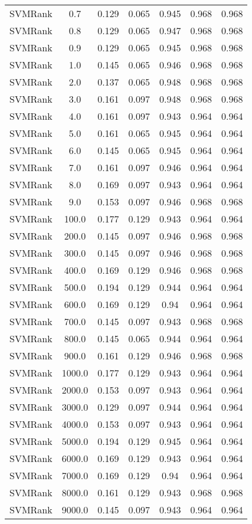 \begin{longtable}{*{7}{c}}
SVMRank & 0.7 & 0.129 & 0.065 & 0.945 & 0.968 & 0.968 \\ 
SVMRank & 0.8 & 0.129 & 0.065 & 0.947 & 0.968 & 0.968 \\ 
SVMRank & 0.9 & 0.129 & 0.065 & 0.945 & 0.968 & 0.968 \\ 
SVMRank & 1.0 & 0.145 & 0.065 & 0.946 & 0.968 & 0.968 \\ 
SVMRank & 2.0 & 0.137 & 0.065 & 0.948 & 0.968 & 0.968 \\ 
SVMRank & 3.0 & 0.161 & 0.097 & 0.948 & 0.968 & 0.968 \\ 
SVMRank & 4.0 & 0.161 & 0.097 & 0.943 & 0.964 & 0.964 \\ 
SVMRank & 5.0 & 0.161 & 0.065 & 0.945 & 0.964 & 0.964 \\ 
SVMRank & 6.0 & 0.145 & 0.065 & 0.945 & 0.964 & 0.964 \\ 
SVMRank & 7.0 & 0.161 & 0.097 & 0.946 & 0.964 & 0.964 \\ 
SVMRank & 8.0 & 0.169 & 0.097 & 0.943 & 0.964 & 0.964 \\ 
SVMRank & 9.0 & 0.153 & 0.097 & 0.946 & 0.968 & 0.968 \\ 
SVMRank & 100.0 & 0.177 & 0.129 & 0.943 & 0.964 & 0.964 \\ 
SVMRank & 200.0 & 0.145 & 0.097 & 0.946 & 0.968 & 0.968 \\ 
SVMRank & 300.0 & 0.145 & 0.097 & 0.946 & 0.968 & 0.968 \\ 
SVMRank & 400.0 & 0.169 & 0.129 & 0.946 & 0.968 & 0.968 \\ 
SVMRank & 500.0 & 0.194 & 0.129 & 0.944 & 0.964 & 0.964 \\ 
SVMRank & 600.0 & 0.169 & 0.129 & 0.94 & 0.964 & 0.964 \\ 
SVMRank & 700.0 & 0.145 & 0.097 & 0.943 & 0.968 & 0.968 \\ 
SVMRank & 800.0 & 0.145 & 0.065 & 0.944 & 0.964 & 0.964 \\ 
SVMRank & 900.0 & 0.161 & 0.129 & 0.946 & 0.968 & 0.968 \\ 
SVMRank & 1000.0 & 0.177 & 0.129 & 0.943 & 0.964 & 0.964 \\ 
SVMRank & 2000.0 & 0.153 & 0.097 & 0.943 & 0.964 & 0.964 \\ 
SVMRank & 3000.0 & 0.129 & 0.097 & 0.944 & 0.964 & 0.964 \\ 
SVMRank & 4000.0 & 0.153 & 0.097 & 0.943 & 0.964 & 0.964 \\ 
SVMRank & 5000.0 & 0.194 & 0.129 & 0.945 & 0.964 & 0.964 \\ 
SVMRank & 6000.0 & 0.169 & 0.129 & 0.943 & 0.964 & 0.964 \\ 
SVMRank & 7000.0 & 0.169 & 0.129 & 0.94 & 0.964 & 0.964 \\ 
SVMRank & 8000.0 & 0.161 & 0.129 & 0.943 & 0.968 & 0.968 \\ 
SVMRank & 9000.0 & 0.145 & 0.097 & 0.943 & 0.964 & 0.964 \\ 
\end{longtable}